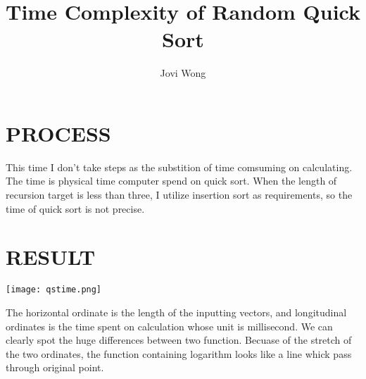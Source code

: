 \documentclass[10pt, letterpaper,UTF8]{article}
\author{Jovi Wong}
\title{Time Complexity of Random Quick Sort}
\begin{document}
\maketitle
\section{PROCESS}
This time I don't take steps as the substition of time comsuming on calculating. The time is physical time computer spend on quick sort. When the length of recursion target is less than three, I utilize insertion sort as requirements, so the time of quick sort is not precise.
\section{RESULT}
\texttt{[image: qstime.png]}

The horizontal ordinate is the length of the inputting vectors, and longitudinal ordinates is the time spent on calculation whose unit is millisecond. We can clearly spot the huge differences between two function. Becuase of the stretch of the two ordinates, the function containing logarithm looks like a line whick pass through original point.  
\end{document}
